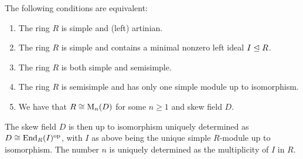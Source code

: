 \begin{theorem}[Wedderburn]
  \label{theorem: wedderburns theorem}
  The following conditions are equivalent:
  \begin{enumerate}
    \item
      \label{enumerate: simple and artinian}
      The ring $R$ is simple and (left) artinian.
    \item
      \label{enumerate: simple and minimal left ideal}
      The ring $R$ is simple and contains a minimal nonzero left ideal $I \trianglelefteq R$.
    \item
      \label{enumerate: simple and semisimple}
      The ring $R$ is both simple and semisimple.
    \item
      \label{enumerate: semisimple with unique simple}
      The ring $R$ is semisimple and has only one simple module up to isomorphism.
    \item
      \label{enumerate: matrix algebra over skew field}
      We have that $R \cong \operatorname{M}_n(D)$ for some $n \geq 1$ and skew field $D$.
  \end{enumerate}
  The skew field $D$ is then up to isomorphism uniquely determined as $D \cong \operatorname{End}_R(I)^{\operatorname{op}}$, with $I$ as above being the unique simple $R$-module up to isomorphism.
  The number $n$ is uniquely determined as the multiplicity of $I$ in $R$.
\end{theorem}



